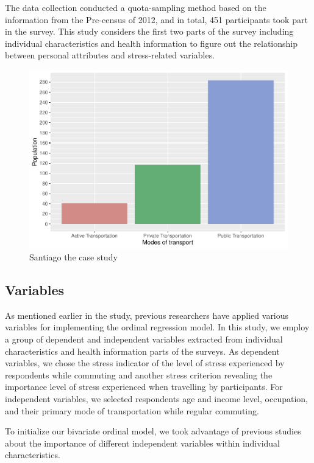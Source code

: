 \documentclass[
11pt, %
oneside, %
english, %
singlespacing, %
]{macthesis} %
\begin{document}
The data collection conducted a quota-sampling method based on the information from the Pre-census of 2012, and in total, 451 participants took part in the survey. This study considers the first two parts of the survey including individual characteristics and health information to figure out the relationship between personal attributes and stress-related variables.
\begin{figure}

{\centering \includegraphics[width=0.85\linewidth]{thesis_files/figure-latex/unnamed-chunk-21-1} 

}

\caption{\label{fig:study boundaries}Santiago the case study}\label{fig:unnamed-chunk-21}
\end{figure}
\hypertarget{variables}{%
\subsection{Variables}\label{variables}}

As mentioned earlier in the study, previous researchers have applied various variables for implementing the ordinal regression model. In this study, we employ a group of dependent and independent variables extracted from individual characteristics and health information parts of the surveys. As dependent variables, we chose the stress indicator of the level of stress experienced by respondents while commuting and another stress criterion revealing the importance level of stress experienced when travelling by participants. For independent variables, we selected respondents age and income level, occupation, and their primary mode of transportation while regular commuting.

To initialize our bivariate ordinal model, we took advantage of previous studies about the importance of different independent variables within individual characteristics.
\end{document}
